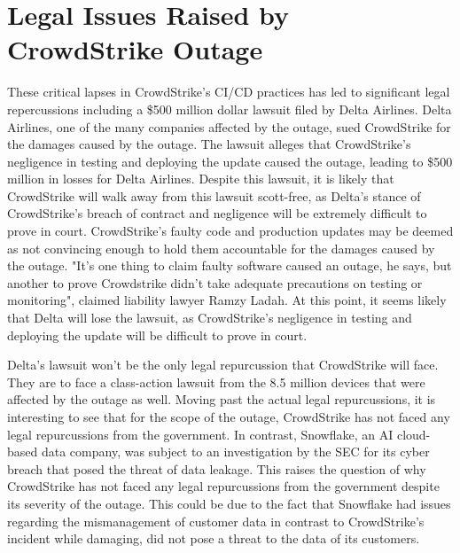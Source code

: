 \section{Legal Issues Raised by CrowdStrike Outage}
These critical lapses in CrowdStrike's CI/CD practices has led to significant legal repercussions including a \$500 million dollar lawsuit
filed by Delta Airlines. Delta Airlines, one of the many companies affected by the outage, sued CrowdStrike for the damages caused by the outage. \cite{delta_sues_crowdstrike}
The lawsuit alleges that CrowdStrike's negligence in testing and deploying the update caused the outage, leading to \$500 million in losses for Delta Airlines.
Despite this lawsuit, it is likely that CrowdStrike will walk away from this lawsuit scott-free, as Delta's stance of CrowdStrike's breach of contract and negligence will be
extremely difficult to prove in court. CrowdStrike's faulty code and production updates may be deemed as not convincing enough to hold them accountable for the damages caused by the outage.
"It's one thing to claim faulty software caused an outage, he says, but another to prove Crowdstrike didn’t take adequate precautions on testing or monitoring", claimed liability lawyer Ramzy Ladah.
\cite{delta_lose} At this point, it seems likely that Delta will lose the lawsuit, as CrowdStrike's negligence in testing and deploying the update will be difficult to prove in court.


Delta's lawsuit won't be the only legal repurcussion that CrowdStrike will face. They are to face a class-action lawsuit from the 8.5 million devices that were affected by the outage as well. Moving past
the actual legal repurcussions, it is interesting to see that for the scope of the outage, CrowdStrike has not faced any legal repurcussions from the government. In contrast, Snowflake, an AI cloud-based data company,
was subject to an investigation by the SEC for its cyber breach that posed the threat of data leakage. \cite{snowflake_sec} This raises the question of why CrowdStrike has not faced any legal repurcussions from the government despite
its severity of the outage. This could be due to the fact that Snowflake had issues regarding the mismanagement of customer data in contrast to CrowdStrike's incident while damaging,
did not pose a threat to the data of its customers.


